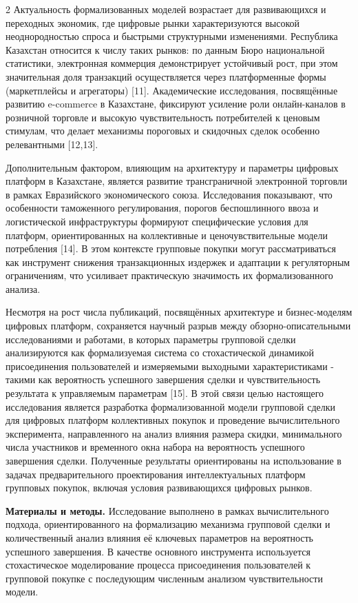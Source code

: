 \begin{multicols}{2}
Актуальность формализованных моделей возрастает для развивающихся и
переходных экономик, где цифровые рынки характеризуются высокой
неоднородностью спроса и быстрыми структурными изменениями. Республика
Казахстан относится к числу таких рынков: по данным Бюро национальной
статистики, электронная коммерция демонстрирует устойчивый рост, при
этом значительная доля транзакций осуществляется через платформенные
формы (маркетплейсы и агрегаторы) {[}11{]}. Академические исследования,
посвящённые развитию e-commerce в Казахстане, фиксируют усиление роли
онлайн-каналов в розничной торговле и высокую чувствительность
потребителей к ценовым стимулам, что делает механизмы пороговых и
скидочных сделок особенно релевантными {[}12,13{]}.

Дополнительным фактором, влияющим на архитектуру и параметры цифровых
платформ в Казахстане, является развитие трансграничной электронной
торговли в рамках Евразийского экономического союза. Исследования
показывают, что особенности таможенного регулирования, порогов
беспошлинного ввоза и логистической инфраструктуры формируют
специфические условия для платформ, ориентированных на коллективные и
ценочувствительные модели потребления {[}14{]}. В этом контексте
групповые покупки могут рассматриваться как инструмент снижения
транзакционных издержек и адаптации к регуляторным ограничениям, что
усиливает практическую значимость их формализованного анализа.

Несмотря на рост числа публикаций, посвящённых архитектуре и
бизнес-моделям цифровых платформ, сохраняется научный разрыв между
обзорно-описательными исследованиями и работами, в которых параметры
групповой сделки анализируются как формализуемая система со
стохастической динамикой присоединения пользователей и измеряемыми
выходными характеристиками - такими как вероятность успешного завершения
сделки и чувствительность результата к управляемым параметрам {[}15{]}.
В этой связи целью настоящего исследования является разработка
формализованной модели групповой сделки для цифровых платформ
коллективных покупок и проведение вычислительного эксперимента,
направленного на анализ влияния размера скидки, минимального числа
участников и временного окна набора на вероятность успешного завершения
сделки. Полученные результаты ориентированы на использование в задачах
предварительного проектирования интеллектуальных платформ групповых
покупок, включая условия развивающихся цифровых рынков.

{\bfseries Материалы и методы.} Исследование выполнено в рамках
вычислительного подхода, ориентированного на формализацию механизма
групповой сделки и количественный анализ влияния её ключевых параметров
на вероятность успешного завершения. В качестве основного инструмента
используется стохастическое моделирование процесса присоединения
пользователей к групповой покупке с последующим численным анализом
чувствительности модели.


\end{multicols}
